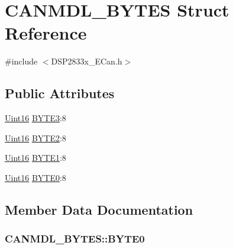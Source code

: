 \hypertarget{struct_c_a_n_m_d_l___b_y_t_e_s}{}\section{C\+A\+N\+M\+D\+L\+\_\+\+B\+Y\+T\+E\+S Struct Reference}
\label{struct_c_a_n_m_d_l___b_y_t_e_s}


{\ttfamily \#include $<$D\+S\+P2833x\+\_\+\+E\+Can.\+h$>$}

\subsection*{Public Attributes}
\begin{DoxyCompactItemize}
\item 
\hyperlink{_d_s_p2833x___device_8h_a59a9f6be4562c327cbfb4f7e8e18f08b}{Uint16} \hyperlink{struct_c_a_n_m_d_l___b_y_t_e_s_abdcd3e7db708e4a0c2a1a1583bac4385}{B\+Y\+T\+E3}\+:8
\item 
\hyperlink{_d_s_p2833x___device_8h_a59a9f6be4562c327cbfb4f7e8e18f08b}{Uint16} \hyperlink{struct_c_a_n_m_d_l___b_y_t_e_s_ae150a0160d9fdf492ddbc37ea0d4e93e}{B\+Y\+T\+E2}\+:8
\item 
\hyperlink{_d_s_p2833x___device_8h_a59a9f6be4562c327cbfb4f7e8e18f08b}{Uint16} \hyperlink{struct_c_a_n_m_d_l___b_y_t_e_s_a84a22e10527ea821b49c23afc9ff866a}{B\+Y\+T\+E1}\+:8
\item 
\hyperlink{_d_s_p2833x___device_8h_a59a9f6be4562c327cbfb4f7e8e18f08b}{Uint16} \hyperlink{struct_c_a_n_m_d_l___b_y_t_e_s_a5ea828d1c4931f5fc20f2af8b0762519}{B\+Y\+T\+E0}\+:8
\end{DoxyCompactItemize}


\subsection{Member Data Documentation}
\hypertarget{struct_c_a_n_m_d_l___b_y_t_e_s_a5ea828d1c4931f5fc20f2af8b0762519}{}
\subsubsection[{B\+Y\+T\+E0}]{ C\+A\+N\+M\+D\+L\+\_\+\+B\+Y\+T\+E\+S\+::\+B\+Y\+T\+E0}\label{struct_c_a_n_m_d_l___b_y_t_e_s_a5ea828d1c4931f5fc20f2af8b0762519}
\hypertarget{struct_c_a_n_m_d_l___b_y_t_e_s_a84a22e10527ea821b49c23afc9ff866a}{}
